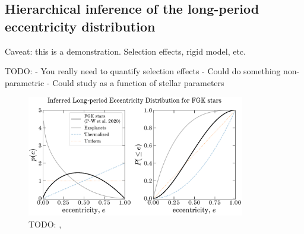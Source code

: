 \documentclass[modern]{aastex63}
\begin{document}
\subsection{Hierarchical inference of the long-period eccentricity distribution}

Caveat: this is a demonstration. Selection effects, rigid model, etc.

TODO:
- You really need to quantify selection effects
- Could do something non-parametric
- Could study as a function of stellar parameters

\begin{figure}[!t]
    \begin{center}
    \includegraphics[width=0.85\textwidth]{eccentricity-distr.pdf}
    \end{center}
    \caption{%
    TODO: \citep{Kipping:2013}, \citep{Jeans:1919}
    \label{fig:eccdist}
    }
\end{figure}


\end{document}

